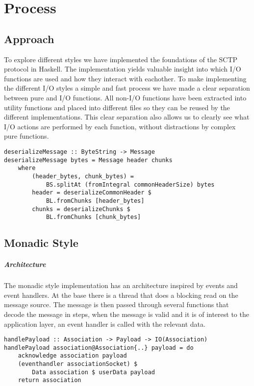 \chapter{Process}
\section{Approach}
To explore different styles we have implemented the foundations of the SCTP protocol\cite{_rfc_????} in Haskell. The implementation yields valuable insight into which I/O functions are used and how they interact with eachother.
To make implementing the different I/O styles a simple and fast process we have made a clear separation between pure and I/O functions. All non-I/O functions have been extracted into utility functions and placed into different files so they can be reused by the different implementations. This clear separation also allows us to clearly see what I/O actions are performed by each function, without distractions by complex pure functions.

\begin{lstlisting}[caption={An example of a shared pure function}]
deserializeMessage :: ByteString -> Message
deserializeMessage bytes = Message header chunks
    where
        (header_bytes, chunk_bytes) =
            BS.splitAt (fromIntegral commonHeaderSize) bytes
        header = deserializeCommonHeader $
            BL.fromChunks [header_bytes]
        chunks = deserializeChunks $
            BL.fromChunks [chunk_bytes]
\end{lstlisting}
\section{Monadic Style}
\paragraph{Architecture}
The monadic style implementation has an architecture inspired by events and event handlers. At the base there is a thread that does a blocking read on the message source. The message is then passed through several functions that decode the message in steps, when the message is valid and it is of interest to the application layer, an event handler is called with the relevant data.

\begin{lstlisting}[caption={The eventhandler is called when a payload is received}]
handlePayload :: Association -> Payload -> IO(Association)
handlePayload association@Association{..} payload = do 
    acknowledge association payload
    (eventhandler associationSocket) $
	    Data association $ userData payload
    return association
\end{lstlisting}

